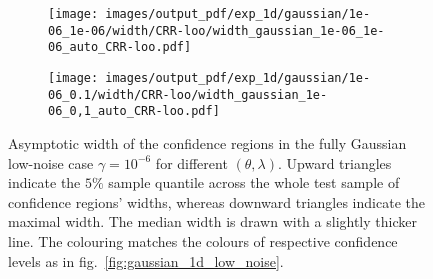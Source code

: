 \documentclass[a4paper,14pt]{extarticle}
\begin{document}
\begin{figure}
\begin{subfigure}[b]{0.25\linewidth}
    \caption{} \label{fig:gaussian_1d_low_noise_width_c2}
  \end{subfigure}%
  \begin{subfigure}[b]{0.25\linewidth}
    \texttt{[image: images/output\_pdf/exp\_1d/gaussian/1e-06\_1e-06/width/CRR-loo/width\_gaussian\_1e-06\_1e-06\_auto\_CRR-loo.pdf]}
    \caption{} \label{fig:gaussian_1d_low_noise_width_c3}
  \end{subfigure}%
  \begin{subfigure}[b]{0.25\linewidth}
    \texttt{[image: images/output\_pdf/exp\_1d/gaussian/1e-06\_0.1/width/CRR-loo/width\_gaussian\_1e-06\_0,1\_auto\_CRR-loo.pdf]}
    \caption{} \label{fig:gaussian_1d_low_noise_width_c4}
  \end{subfigure}%
  \caption{Asymptotic width of the confidence regions in the fully Gaussian low-noise case
  $\gamma=10^{-6}$ for different $(\theta, \lambda)$. Upward triangles indicate the
  $5\%$ sample quantile across the whole test sample of confidence regions' widths,
  whereas downward triangles indicate the maximal width. The median width is drawn
  with a slightly thicker line. The colouring matches the colours of respective confidence
  levels as in fig.~\ref{fig:gaussian_1d_low_noise}.}
  \label{fig:gaussian_1d_low_noise_width}
\end{figure}
\end{document}
